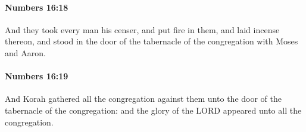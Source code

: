 		\paragraph{Numbers 16:18} %
			\label{NUMBERS-16-18}

			And they took every man his censer, and put fire in them, and laid incense thereon, and stood in the door of the tabernacle of the congregation with Moses and Aaron.


		\paragraph{Numbers 16:19} %
			\label{NUMBERS-16-19}

			And Korah gathered all the congregation against them unto the door of the tabernacle of the congregation: and the glory of the LORD appeared unto all the congregation.



